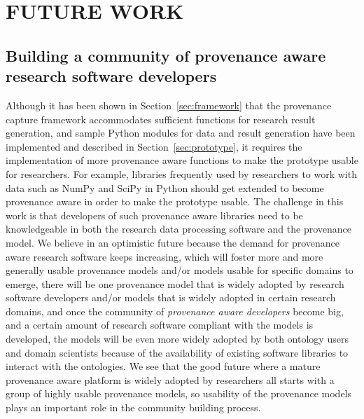 \chapter{FUTURE WORK}
\label{future-work}

\section{Building a community of provenance aware research software developers}
Although it has been shown in Section~\ref{sec:framework} that the provenance capture framework accommodates sufficient functions for research result generation, and sample Python modules for data and result generation have been implemented and described in Section~\ref{sec:prototype}, it requires the implementation of more provenance aware functions to make the prototype usable for researchers. For example, libraries frequently used by researchers to work with data such as NumPy and SciPy in Python should get extended to become provenance aware in order to make the prototype usable. The challenge in this work is that developers of such provenance aware libraries need to be knowledgeable in both the research data processing software and the provenance model. We believe in an optimistic future because the demand for provenance aware research software keeps increasing, which will foster more and more generally usable provenance models and/or models usable for specific domains to emerge, there will be one provenance model that is widely adopted by research software developers and/or models that is widely adopted in certain research domains, and once the community of \emph{provenance aware developers} become big, and a certain amount of research software compliant with the models is developed, the models will be even more widely adopted by both ontology users and domain scientists because of the availability of existing software libraries to interact with the ontologies. We see that the good future where a mature provenance aware platform is widely adopted by researchers all starts with a group of highly usable provenance models, so usability of the provenance models plays an important role in the community building process.

